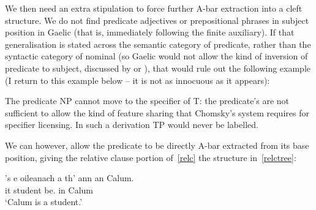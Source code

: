 \documentclass[output=paper]{langsci/langscibook}
\begin{document}
We then need an extra stipulation to force further A-bar extraction into a
cleft structure.  We do not find predicate adjectives or prepositional phrases
in subject position in Gaelic (that is, immediately following the finite
auxiliary). If that generalisation is stated across the semantic category of
predicate, rather than the syntactic category of nominal (so Gaelic would not
allow the kind of inversion of predicate to subject, discussed by
\citet{moro:97} or \citet{dendikken:06}), that would rule out the following
example (I return to this example below -- it is not as innocuous as it
appears):

\ea {}
    \label{oileanach-ann}
\z
The predicate NP cannot move to the specifier of T: the predicate's
 are not sufficient to allow the kind of feature sharing that
Chomsky's system requires for specifier licensing. In such a derivation TP
would never be labelled.

We can however, allow the predicate to be directly A-bar extracted from its
base position, giving the relative clause portion of~\eqref{relc} the structure
in~\eqref{relctree}:

\ea {} \label{relc}
\sn
\gll 's e oileanach a th' {ann an} Calum.\\
\Cop{} it student \Rel{} be.\Prs{} in Calum\\
\glt \enquote*{Calum is a student.}
\z

\ea \label{relctree}

\z
\end{document}
